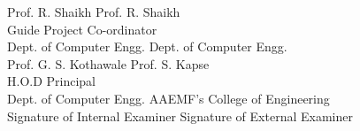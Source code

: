 

\noindent
\hspace*{1.25cm}Prof. R. Shaikh \hfill Prof. R. Shaikh\hspace*{1.5cm}\\
\hspace*{2cm}Guide \hfill Project Co-ordinator\hspace*{1cm}\\
\hspace*{0.5cm}Dept. of Computer Engg. \hfill Dept. of Computer Engg.\hspace*{0.5cm}\\[2\baselineskip]

\noindent
\hspace*{0.75cm}Prof. G. S. Kothawale \hfill Prof. S. Kapse\hspace*{1.5cm}\\
\hspace*{2cm}H.O.D \hfill Principal\hspace*{2cm}\\
\hspace*{0.5cm}Dept. of Computer Engg. \hfill AAEMF’s College of Engineering\\[2\baselineskip]

\noindent
Signature of Internal Examiner \hfill Signature of External Examiner

